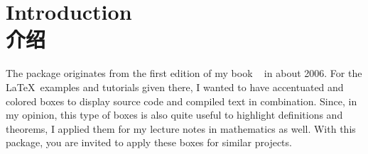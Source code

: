 
\section{Introduction\\介绍}%
%



The package originates from %
the first edition of my book %
\frqq~%
in about 2006.%
For the \LaTeX\ examples and tutorials given there, %
I wanted to have accentuated and colored boxes to display source code and
compiled text in combination.%
Since, in my opinion, %
this type of boxes is also quite useful to highlight definitions and theorems,%
I applied them for my lecture notes in mathematics %
as well.%
With this package, you are invited to apply these boxes for similar projects.


